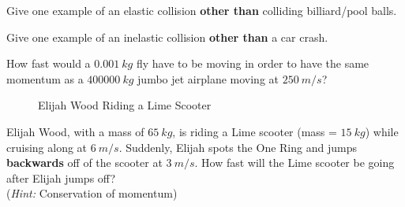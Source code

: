 \begin{questions}
\question[2] Give one example of an elastic collision \textbf{other than} colliding billiard/pool balls. 

\qspp

\question[2] Give one example of an inelastic collision \textbf{other than} a car crash. 

\qspp

\question[2] How fast would a $\SI{0.001}{kg}$ fly have to be moving in order to have the same momentum as a $\SI{400000}{kg}$ jumbo jet airplane moving at $\SI{250}{m/s}$? 

\qsppp

\begin{figure}[H]
    \centering
    \caption{Elijah Wood Riding a Lime Scooter}
\end{figure}

\question[3] Elijah Wood, with a mass of $\SI{65}{kg}$, is riding a Lime scooter (mass = $\SI{15}{kg}$) while cruising along at $\SI{6}{m/s}$. Suddenly, Elijah spots the One Ring and jumps \textbf{backwards} off of the scooter at $\SI{3}{m/s}$. How fast will the Lime scooter be going after Elijah jumps off? \\(\emph{Hint:} Conservation of momentum)


\end{questions}



